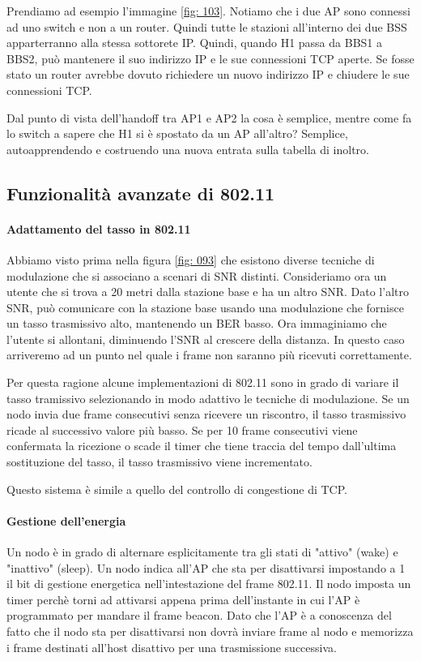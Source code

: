 \documentclass[11pt,a4paper]{book}
\begin{document}
Prendiamo ad esempio l'immagine \ref{fig: 103}. Notiamo che i due AP sono connessi ad uno switch e non a un router. Quindi tutte le stazioni all'interno dei due BSS apparterranno alla stessa sottorete IP. Quindi, quando H1 passa da BBS1 a BBS2, può mantenere il suo indirizzo IP e le sue connessioni TCP aperte. Se fosse stato un router avrebbe dovuto richiedere un nuovo indirizzo IP e chiudere le sue connessioni TCP.

Dal punto di vista dell'handoff tra AP1 e AP2 la cosa è semplice, mentre come fa lo switch a sapere che H1 si è spostato da un AP all'altro? Semplice, autoapprendendo e costruendo una nuova entrata sulla tabella di inoltro.

\subsection{Funzionalità avanzate di 802.11}
\paragraph{Adattamento del tasso in 802.11}
Abbiamo visto prima nella figura  \ref{fig: 093} che esistono diverse tecniche di modulazione che si associano a scenari di SNR distinti. Consideriamo ora un utente che si trova a 20 metri dalla stazione base e ha un altro SNR. Dato l'altro SNR, può comunicare con la stazione base usando una modulazione che fornisce un tasso trasmissivo alto, mantenendo un BER basso. Ora immaginiamo che l'utente si allontani, diminuendo l'SNR al crescere della distanza. In questo caso arriveremo ad un punto nel quale i frame non saranno più ricevuti correttamente.

Per questa ragione alcune implementazioni di 802.11 sono in grado di variare il tasso tramissivo selezionando in modo adattivo le tecniche di modulazione. Se un nodo invia due frame consecutivi senza ricevere un riscontro, il tasso trasmissivo ricade al successivo valore più basso. Se per 10 frame consecutivi viene confermata la ricezione o scade il timer che tiene traccia del tempo dall'ultima sostituzione del tasso, il tasso trasmissivo viene incrementato.

Questo sistema è simile a quello del controllo di congestione di TCP.

\paragraph{Gestione dell'energia}
Un nodo è in grado di alternare esplicitamente tra gli stati di "attivo" (wake) e "inattivo" (sleep). Un nodo indica all'AP che sta per disattivarsi impostando a 1 il bit di gestione energetica nell'intestazione del frame 802.11. Il nodo imposta un timer perchè torni ad attivarsi appena prima dell'instante in cui l'AP è programmato per mandare il frame beacon. Dato che l'AP è a conoscenza del fatto che il nodo sta per disattivarsi non dovrà inviare frame al nodo e memorizza i frame destinati all'host disattivo per una trasmissione successiva.
\end{document}
